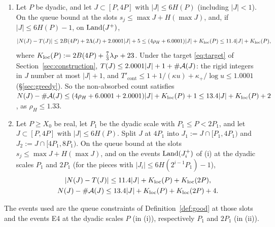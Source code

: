 \begin{corollary}\label{cor:localcount}
\begin{enumerate}[label=\textup{(\roman*)},leftmargin=*]
\item Let $P$ be dyadic, and let $J\subset[P,4P]$ with $|J|\le6H(P)$ (including $|J|<1$). On the queue bound at the slots
$s_j\le\max J+H(\max J)$, and, if $|J|\le6H(P)-1$, on $\mathrm{Land}(J^+)$,
\begin{equation}\label{eq:localcount}
|N(J)-T(J)|\le2B(4P)+2\Lambda(J)+2.0001|J|+5\le(4\rho_H+6.0001)|J|+K_{\mathrm{loc}}(P)\le11.4|J|+K_{\mathrm{loc}}(P),
\end{equation}
where $K_{\mathrm{loc}}(P):=2B(4P)+\tfrac73\lambda_P+23$.
Under the target \eqref{eq:target} of Section~\ref{sec:construction}, $T(J)\le2.0001|J|+1+\#\mathcal{A}(J)$: the rigid integers in
$J$ number at most $|J|+1$, and $T'_{\mathrm{cont}}\le1+1/(\kappa u)+\kappa_+/\log u\le1.0001$ (\S\ref{sec:greedy}). So the
non-absorbed count satisfies $N(J)-\#\mathcal{A}(J)\le(4\rho_H+6.0001+2.0001)|J|+K_{\mathrm{loc}}(P)+1\le13.4|J|+K_{\mathrm{loc}}(P)+2$, as
$\rho_H\le1.33$.
\item Let $P\ge X_0$ be real, let $P_1$ be the dyadic scale with $P_1\le P<2P_1$, and let $J\subset[P,4P]$ with
$|J|\le6H(P)$. Split $J$ at $4P_1$ into $J_1:=J\cap[P_1,4P_1)$ and $J_2:=J\cap[4P_1,8P_1)$. On the queue bound at the
slots $s_j\le\max J+H(\max J)$, and on the events $\mathrm{Land}(J_i^+)$ of (i) at the dyadic scales $P_1$ and $2P_1$ (for the
pieces with $|J_i|\le6H(2^{i-1}P_1)-1$),
\begin{gather*}
|N(J)-T(J)|\le11.4|J|+K_{\mathrm{loc}}(P)+K_{\mathrm{loc}}(2P),\\
N(J)-\#\mathcal{A}(J)\le13.4|J|+K_{\mathrm{loc}}(P)+K_{\mathrm{loc}}(2P)+4.
\end{gather*}
\end{enumerate}
The events used are the queue constraints of Definition~\ref{def:good} at those slots and the events E4 at the dyadic
scales $P$ (in (i)), respectively $P_1$ and $2P_1$ (in (ii)).
\end{corollary}

